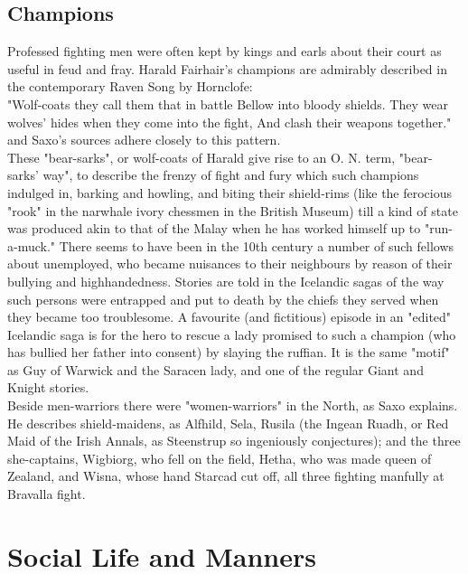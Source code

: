 \documentclass[10pt,a4paper]{report}
\begin{document}
\section{Champions}
Professed fighting men were often kept by kings and earls about their court as useful in feud and fray. Harald Fairhair's champions are admirably described in the contemporary Raven Song by Hornclofe:\\

     "Wolf-coats they call them that in battle
     Bellow into bloody shields.
     They wear wolves' hides when they come into the fight,
     And clash their weapons together."\\

and Saxo's sources adhere closely to this pattern.\\

These "bear-sarks", or wolf-coats of Harald give rise to an O. N. term, "bear-sarks' way", to describe the frenzy of fight and fury which such champions indulged in, barking and howling, and biting their shield-rims (like the ferocious "rook" in the narwhale ivory chessmen in the British Museum) till a kind of state was produced akin to that of the Malay when he has worked himself up to "run-a-muck." There seems to have been in the 10th century a number of such fellows about unemployed, who became nuisances to their neighbours by reason of their bullying and highhandedness. Stories are told in the Icelandic sagas of the way such persons were entrapped and put to death by the chiefs they served when they became too troublesome. A favourite (and fictitious) episode in an "edited" Icelandic saga is for the hero to rescue a lady promised to such a champion (who has bullied her father into consent) by slaying the ruffian. It is the same "motif" as Guy of Warwick and the Saracen lady, and one of the regular Giant and Knight stories.\\

Beside men-warriors there were "women-warriors" in the North, as Saxo explains. He describes shield-maidens, as Alfhild, Sela, Rusila (the Ingean Ruadh, or Red Maid of the Irish Annals, as Steenstrup so ingeniously conjectures); and the three she-captains, Wigbiorg, who fell on the field, Hetha, who was made queen of Zealand, and Wisna, whose hand Starcad cut off, all three fighting manfully at Bravalla fight.


\chapter{Social Life and Manners}
\end{document}
